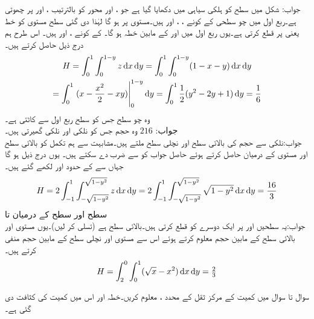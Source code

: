 جواب: شکل  میں سطح  کو ہلکی سیاہی میں دکھایا گیا ہے جو ،  اور  محور کو بالترتیب ،  اور  پر چھوتی ہے۔ربع اول میں چو سطحی کے کونے ، ،  اور  ہیں۔مستوی  پر  ہو گا لہٰذا دی گئی سطح  مستوی کو  خط  یعنی  پر قطع کرتی ہے۔یوں ربع اول میں  اور   کے مابین خطہ  ہو گا۔ کے کونے ،  اور  ہیں۔ اس طرح ہم درج ذیل حاصل کرتے ہیں۔
\begin{multline*}
H=\int_0^1\int_0^{1-y} z\dif x\dif y=\int_0^1\int_0^{1-y} (1-x-y)\dif x\dif y\\
=\int_0^1 \left.(x-\frac{x^2}{2}-xy)\right|_0^{1-y}\dif y=\int_0^1 \frac{1}{2}(y^2-2y+1)\dif y=\frac{1}{6}
\end{multline*}
وہ چو سطح جس کو سطح  ربع اول سے کاٹتی ہے۔\\
جواب:\quad 
 $216$
وہ حجم جس کو نلکی  اور نلکی  گھیرتی ہیں۔\\
جواب:نلکی  سے حجم کی بالائی سطح  اور نچلی سطح  ملتے ہیں۔مشابہت سے ہم تکمل کو بالائی سطح اور  مستوی کے درمیان حاصل کرتے ہوئے حاصل جواب کو  سے ضرب دے سکتے ہیں۔ یوں درج ذیل ہو گا جہاں  سے  کے حدود  اور  لکھے گئے ہیں۔
\begin{align*}
H=2\int_{-1}^{1}\int_{-\sqrt{1-y^2}}^{\sqrt{1-y^2}}z\dif x\dif y=2\int_{-1}^{1}\int_{-\sqrt{1-y^2}}^{\sqrt{1-y^2}}\sqrt{1-y^2}\dif x\dif y=\frac{16}{3}
\end{align*}
سطح  اور سطح  کے درمیان  تا \\
جواب:یہ سطحیں  اور  پر ایک دوسرے کو قطع کرتی ہیں۔بالائی سطح  ہے (تسلی کر لیں)۔یوں  مستوی اور بالائی سطح کے مابین حجم معلوم کرتے ہوئے اس سے  مستوی اور نچلی سطح کے مابین حجم منفی کرتے ہیں۔
\begin{align*}
H=\int_{2}^{0}\int_{0}^{1} (\sqrt{x}-x^2)\dif x\dif y=\tfrac{2}{3}
\end{align*}

سوال  تا سوال  میں کمیت کے مرکز ثقل کے محدد ،  معلوم کریں۔خطہ  اور اس میں کمیت کی کثافت  دی گئی ہے۔

